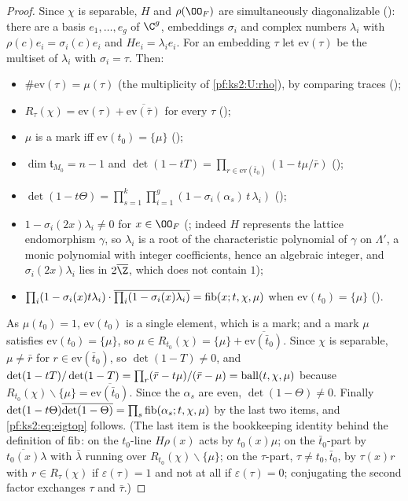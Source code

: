 \begin{proof}
Since $\chi$ is separable, $H$ and $\rho(\kstwoOF)$ are
simultaneously diagonalizable (): there are a basis
$e_1,\dots,e_g$ of $\C^g$, embeddings $\sigma_i$ and complex numbers $\lambda_i$ with $\rho(c)e_i=\sigma_i(c)e_i$ and
$He_i=\lambda_ie_i$. For an embedding $\tau$ let $\mathrm{ev}(\tau)$ be the multiset of $\lambda_i$ with
$\sigma_i=\tau$. Then:
\begin{itemize}
\item $\#\mathrm{ev}(\tau)=\mu(\tau)$ (the multiplicity of \ref{pf:ks2:U:rho}), by comparing traces
  ();
\item $R_\tau(\chi)=\mathrm{ev}(\tau)+\overline{\mathrm{ev}(\bar\tau)}$ for every $\tau$
  ();
\item $\mu$ is a mark iff $\mathrm{ev}(t_0)=\{\mu\}$ ();
\item $\dim\mathfrak{t}_{M_0}=n-1$ and $\det(1-tT)=\prod_{r\in\mathrm{ev}(\bar t_0)}(1-t\mu/\bar r)$
  ();
\item $\det(1-t\Theta)=\prod_{s=1}^k\prod_{i=1}^g(1-\sigma_i(\alpha_s)\,t\,\lambda_i)$
  ();
\item $1-\sigma_i(2x)\lambda_i\ne0$ for $x\in\kstwoOF$ (; indeed
  $H$ represents the lattice endomorphism $\gamma$, so $\lambda_i$ is a root of the characteristic polynomial
  of $\gamma$ on $\Lambda'$, a monic polynomial with integer coefficients, hence an algebraic integer, and
  $\sigma_i(2x)\lambda_i$ lies in $2\overline{\Z}$, which does not contain $1$);
\item $\prod_i(1-\sigma_i(x)t\lambda_i)\cdot\overline{\prod_i(1-\sigma_i(x)\lambda_i)}=\mathrm{fib}(x;t,\chi,\mu)$ when
  $\mathrm{ev}(t_0)=\{\mu\}$ ().
\end{itemize}
As $\mu(t_0)=1$, $\mathrm{ev}(t_0)$ is a single element, which is a mark; and a mark $\mu$ satisfies
$\mathrm{ev}(t_0)=\{\mu\}$, so $\mu\in R_{t_0}(\chi)=\{\mu\}+\overline{\mathrm{ev}(\bar t_0)}$. Since $\chi$ is
separable, $\mu\ne\bar r$ for $r\in\mathrm{ev}(\bar t_0)$, so $\det(1-T)\ne0$, and
$\det(1-tT)/\det(1-T)=\prod_{r}(\bar r-t\mu)/(\bar r-\mu)=\mathrm{ball}(t,\chi,\mu)$ because
$R_{t_0}(\chi)\smallsetminus\{\mu\}=\overline{\mathrm{ev}(\bar t_0)}$. Since the $\alpha_s$ are even,
$\det(1-\Theta)\ne0$. Finally $\det(1-t\Theta)\overline{\det(1-\Theta)}=\prod_s\mathrm{fib}(\alpha_s;t,\chi,\mu)$
by the last two items, and \eqref{pf:ks2:eq:eigtop} follows. (The last item is the bookkeeping identity
behind the definition of $\mathrm{fib}$: on the $t_0$-line $H\rho(x)$ acts by $t_0(x)\mu$; on the
$\bar t_0$-part by $\overline{t_0(x)}\lambda$ with $\bar\lambda$ running over $R_{t_0}(\chi)\smallsetminus\{\mu\}$;
on the $\tau$-part, $\tau\ne t_0,\bar t_0$, by $\tau(x)r$ with $r\in R_\tau(\chi)$ if $\varepsilon(\tau)=1$ and
not at all if $\varepsilon(\tau)=0$; conjugating the second factor exchanges $\tau$ and $\bar\tau$.)
\end{proof}

